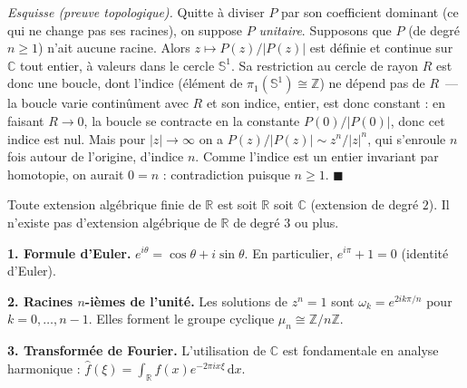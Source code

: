 \begin{mdframed}[style=proofbar]
  \textit{Esquisse (preuve topologique).}
  Quitte à diviser $P$ par son coefficient dominant (ce qui ne change pas ses
  racines), on suppose $P$ \emph{unitaire}. Supposons que $P$ (de degré
  $n\geq 1$) n'ait aucune racine. Alors
  $z \mapsto P(z)/|P(z)|$ est définie et continue sur $\mathbb{C}$ tout entier,
  à valeurs dans le cercle $\mathbb{S}^1$. Sa restriction au cercle de rayon $R$
  est donc une boucle, dont l'indice (élément de $\pi_1(\mathbb{S}^1)\cong\mathbb{Z}$)
  ne dépend pas de $R$~— la boucle varie continûment avec $R$ et son indice,
  entier, est donc constant : en faisant $R \to 0$, la boucle se contracte
  en la constante $P(0)/|P(0)|$, donc cet indice est nul. Mais pour $|z|\to\infty$
  on a $P(z)/|P(z)| \sim z^n/|z|^n$, qui s'enroule $n$ fois autour de l'origine,
  d'indice $n$. Comme l'indice est un entier invariant par homotopie, on aurait
  $0 = n$ : contradiction puisque $n \geq 1$. \hfill$\blacksquare$
\end{mdframed}

Toute extension algébrique finie de $\mathbb{R}$ est soit $\mathbb{R}$ soit $\mathbb{C}$
(extension de degré $2$). Il n'existe pas d'extension algébrique de $\mathbb{R}$
de degré $3$ ou plus.

\decsep{}



\begin{mdframed}[style=exbar]
  \textbf{1. Formule d'Euler.}\enspace%
  $e^{i\theta} = \cos\theta + i\sin\theta$. En particulier,
  $e^{i\pi} + 1 = 0$ (identité d'Euler).

  \smallskip\noindent
  \textbf{2. Racines $n$-ièmes de l'unité.}\enspace%
  Les solutions de $z^n = 1$ sont $\omega_k = e^{2ik\pi/n}$ pour $k = 0, \ldots, n-1$.
  Elles forment le groupe cyclique $\mu_n \cong \mathbb{Z}/n\mathbb{Z}$.

  \smallskip\noindent
  \textbf{3. Transformée de Fourier.}\enspace%
  L'utilisation de $\mathbb{C}$ est fondamentale en analyse harmonique :
  $\hat{f}(\xi) = \int_{\mathbb{R}} f(x) e^{-2\pi i x\xi}\,\mathrm{d}x$.
\end{mdframed}

